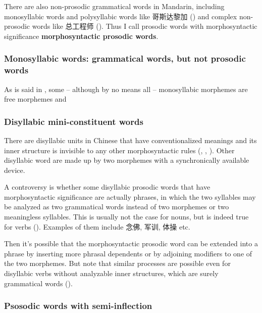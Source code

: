 \documentclass[UTF8, a4paper, oneside, scheme=plain]{ctexrep}
\newcommand*{\concept}[1]{\textbf{#1}}
\begin{document}
There are also non-prosodic grammatical words in Mandarin,
including monosyllabic words and polysyllabic words like 哥斯达黎加 
()
and complex non-prosodic words like 
总工程师 ().
Thus I call prosodic words with morphosyntactic significance \concept{morphosyntactic prosodic words}.

\subsubsection{Monosyllabic words: grammatical words, but not prosodic words}\label{sec:pos.word.monosyllabic}

As is said in , 
some -- although by no means all -- monosyllabic morphemes 
are free morphemes and

\subsubsection{Disyllabic mini-constituent words}\label{sec:pos.architecture.word.mini-constituent}

There are disyllabic units in Chinese 
that have conventionalized meanings and its inner structure is invisible 
to any other morphosyntactic rules 
(,
,
).
Other disyllabic word are made up by two morphemes with a synchronically available device.

A controversy is whether some disyllabic prosodic words that have morphosyntactic significance
are actually phrases,
in which the two syllables may be analyzed 
as two grammatical words
instead of two morphemes or two meaningless syllables.
This is usually not the case for nouns, 
but is indeed true for verbs
().
Examples of them include 念佛, 军训, 体操 etc. 

Then it's possible that the morphosyntactic prosodic word can be extended into a phrase 
by inserting more phrasal dependents 
or by adjoining modifiers to one of the two morphemes.
But note that similar processes are possible even for 
disyllabic verbs without analyzable inner structures,
which are surely grammatical words ().

\subsubsection{Psosodic words with semi-inflection}\label{sec:pos.architecture.word-confusing.constituent}
\end{document}
